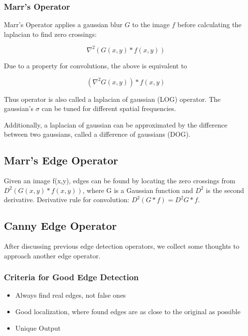 \documentclass{article}
\begin{document}
\begin{multicols}{2}
\subsubsection{Marr's Operator}

Marr's Operator applies a gaussian blur $G$ to the image $f$ before calculating the laplacian to find zero crossings:

$$
\nabla^2 (G(x,y) * f(x,y))
$$

Due to a property for convolutions, the above is equivalent to 

$$
(\nabla^2 G(x,y)) * f(x,y)
$$

Thus operator is also called a laplacian of gaussian (LOG) operator. The gaussian's $\sigma$ can be tuned for different spatial frequencies.

Additionally, a laplacian of gaussian can be approximated by the difference between two gaussians, called a difference of gaussians (DOG).

\subsection{Marr's Edge Operator}

Given an image f(x,y), edges can be found by locating the zero crossings from \(D^2(G(x,y)*f(x,y))\), where G is a Gaussian function and $D^2$ is the second derivative.
Derivative rule for convolution: \(D^2(G*f) = D^2G * f\).

\subsection{Canny Edge Operator}

After discussing previous edge detection operators, we collect some thoughts to approach another edge operator.

\subsubsection{Criteria for Good Edge Detection}
\begin{itemize}
      \item Always find real edges, not false ones
  
      \item Good localization, where found edges are as close to the original as possible
  
      \item Unique Output
\end{itemize}


\end{multicols}
\end{document}
